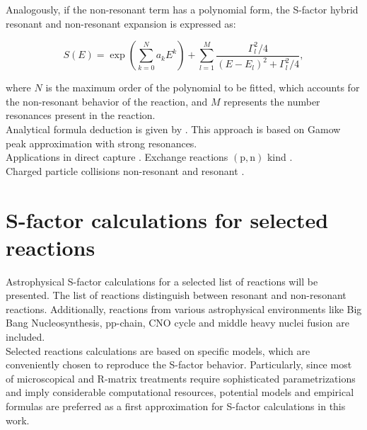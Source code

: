 \documentclass[openany]{book}
\begin{document}
Analogously, if the non-resonant term has a polynomial form, the S-factor hybrid resonant and non-resonant expansion is expressed as:

\begin{equation}  \label{eq:empirical_hybridExponential}
	S(E) =  \exp { \left( \sum _{k = 0}^{N} {a_kE^k} \right) } + \sum_{l = 1}^{M} {\frac{\Gamma_l^2/4}{(E - E_l)^2 + \Gamma_l^2/4}},
\end{equation}

where $N$ is the maximum order of the polynomial to be fitted, which accounts for the non-resonant behavior of the reaction, and $M$ represents the number resonances present in the reaction.  \\

Analytical formula deduction is given by \cite{kimura_bonasera_2013}. This approach is based on Gamow peak approximation with strong resonances. \\

Applications in direct capture \cite{jennings_karataglidis_shoppa_1998}.  Exchange reactions $\mathrm{(p, n)}$ kind \cite{hussein_abdullah_2020}. \\

Charged particle collisions non-resonant \cite{ueda_sargeant_pato_hussein_2002} and resonant \cite{ueda_sargeant_pato_hussein_2004}. \\


\chapter{S-factor calculations for selected reactions} \label{ch:sfactorCalculations}

Astrophysical S-factor calculations for a selected list of reactions will be presented. The list of reactions distinguish between resonant and non-resonant reactions. Additionally, reactions from various astrophysical environments like Big Bang Nucleosynthesis, pp-chain, CNO cycle and middle heavy nuclei fusion are included.  \\

Selected reactions calculations are based on specific models, which are conveniently chosen to reproduce the S-factor behavior. Particularly, since most of microscopical and R-matrix treatments require sophisticated parametrizations and imply considerable computational resources, potential models and empirical formulas are preferred as a first approximation for S-factor calculations in this work.  \\
\end{document}
